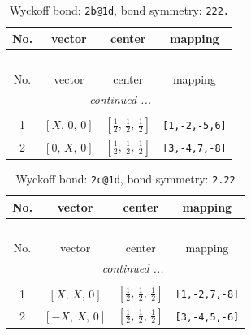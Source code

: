 \documentclass[fleqn,8pt]{jsarticle}
\begin{document}
\renewcommand{\arraystretch}{1.2}
\begin{longtable}{cccc}
\caption{Wyckoff bond: {\tt 2b@1d}, bond symmetry: {\tt 222.}}
 \\
 \hline \hline
No. & vector & center & mapping \\ \hline \endfirsthead

\multicolumn{3}{l}{\tablename\ \thetable{}} \\
 \hline \hline
No. & vector & center & mapping \\ \hline \endhead

 \hline \hline
\multicolumn{3}{r}{\footnotesize\it continued ...} \\ \endfoot

 \hline \hline
\multicolumn{3}{r}{} \\ \endlastfoot

1 & $\left[ X,\, 0,\, 0 \right]$ & $\left[ \frac{1}{2},\, \frac{1}{2},\, \frac{1}{2} \right]$ & {\tt [1,-2,-5,6]} \\ \hline
2 & $\left[ 0,\, X,\, 0 \right]$ & $\left[ \frac{1}{2},\, \frac{1}{2},\, \frac{1}{2} \right]$ & {\tt [3,-4,7,-8]} \\
\end{longtable}
\renewcommand{\arraystretch}{1.2}
\begin{longtable}{cccc}
\caption{Wyckoff bond: {\tt 2c@1d}, bond symmetry: {\tt 2.22}}
 \\
 \hline \hline
No. & vector & center & mapping \\ \hline \endfirsthead

\multicolumn{3}{l}{\tablename\ \thetable{}} \\
 \hline \hline
No. & vector & center & mapping \\ \hline \endhead

 \hline \hline
\multicolumn{3}{r}{\footnotesize\it continued ...} \\ \endfoot

 \hline \hline
\multicolumn{3}{r}{} \\ \endlastfoot

1 & $\left[ X,\, X,\, 0 \right]$ & $\left[ \frac{1}{2},\, \frac{1}{2},\, \frac{1}{2} \right]$ & {\tt [1,-2,7,-8]} \\ \hline
2 & $\left[ - X,\, X,\, 0 \right]$ & $\left[ \frac{1}{2},\, \frac{1}{2},\, \frac{1}{2} \right]$ & {\tt [3,-4,5,-6]} \\
\end{longtable}
\renewcommand{\arraystretch}{1.2}
\end{document}
